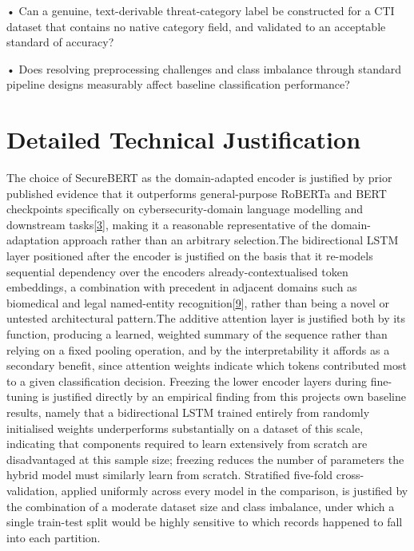 \documentclass[12pt,a4paper]{report}
\begin{document}
• Can a genuine, text-derivable threat-category label be constructed for
a CTI dataset that contains no native category field, and validated to
an acceptable standard of accuracy?

• Does resolving preprocessing challenges and class imbalance through
standard pipeline designs measurably affect baseline classification
performance?

\protect{}\label{_Toc239502929}{}\section{Detailed
Technical Justification}

The choice of SecureBERT as the domain-adapted encoder is justified by
prior published evidence that it outperforms general-purpose RoBERTa and
BERT checkpoints specifically on cybersecurity-domain language modelling
and downstream
tasks{[}\href{file:///D:/Downloads/final-report-formatted-v4(1).docx\#ref_3}{\ul{3}}{]},
making it a reasonable representative of the domain-adaptation approach
rather than an arbitrary selection.The bidirectional LSTM layer
positioned after the encoder is justified on the basis that it re-models
sequential dependency over the encoder\textquotesingle s
already-contextualised token embeddings, a combination with precedent in
adjacent domains such as biomedical and legal named-entity
recognition{[}\href{file:///D:/Downloads/final-report-formatted-v4(1).docx\#ref_9}{\ul{9}}{]},
rather than being a novel or untested architectural pattern.The additive
attention layer is justified both by its function, producing a learned,
weighted summary of the sequence rather than relying on a fixed pooling
operation, and by the interpretability it affords as a secondary
benefit, since attention weights indicate which tokens contributed most
to a given classification decision. Freezing the lower encoder layers
during fine-tuning is justified directly by an empirical finding from
this project\textquotesingle s own baseline results, namely that a
bidirectional LSTM trained entirely from randomly initialised weights
underperforms substantially on a dataset of this scale, indicating that
components required to learn extensively from scratch are disadvantaged
at this sample size; freezing reduces the number of parameters the
hybrid model must similarly learn from scratch. Stratified five-fold
cross-validation, applied uniformly across every model in the
comparison, is justified by the combination of a moderate dataset size
and class imbalance, under which a single train-test split would be
highly sensitive to which records happened to fall into each partition.
\end{document}

